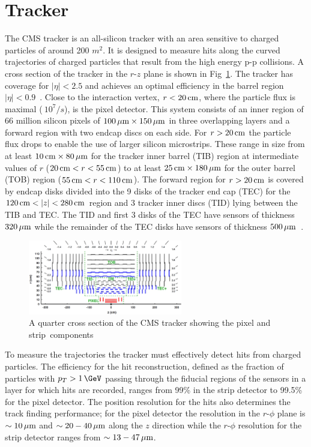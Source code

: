 \section{Tracker}
The CMS tracker is an all-silicon tracker with an area sensitive to charged particles of around 200 $m^2$. It is designed to measure hits along the
curved trajectories of charged particles that result from the high energy p-p collisions. A cross section of the tracker in the $r$-$z$ plane is shown in Fig~\ref{TRACKER_SLICE}.
The tracker has coverage for $|\eta| < 2.5$ and achieves an optimal efficiency in the barrel region $|\eta| < 0.9$~\cite{tracker_performance,tracker_tdr}. 
Close to the interaction vertex, $r < 20\,\text{cm}$, where the particle flux is maximal ($~10^7/s$), is the pixel detector. This system consists of an inner region of 66 million silicon 
pixels of $100\,\mu\text{m} \times 150\,\mu\text{m}$ in three overlapping layers and a forward region with two endcap discs on each side.
For $r > 20\,\text{cm}$ the particle flux drops to enable the use of larger silicon microstrips. These range in size from at least $10 \,\text{cm} \times 80 \,\mu\text{m}$ for the 
tracker inner barrel (TIB) region 
at intermediate values of $r$ ($20\,\text{cm} < r < 55\,\text{cm}$) to at least $25\,\text{cm} \times 180\,\mu\text{m}$ for the outer barrel (TOB) region ($55 \,\text{cm} < r < 110 \,\text{cm}$). The forward region
for $r > 20\,\text{cm}$ is covered by endcap disks divided into the 9 disks of the tracker end cap (TEC) for the $120 \,\text{cm} < |z| < 280 \,\text{cm}$ region and 
3 tracker inner discs (TID) lying between the TIB and TEC. The TID and first 3 disks of the TEC have sensors of thickness $320\,\mu\text{m}$ while the remainder of the TEC disks
have sensors of thickness $500\,\mu\text{m}$~\cite{tracker_tdr}.

\begin{figure}
\centering
    \includegraphics[width=0.6\textwidth]{./Figures/detector/CMS2Dtracker}
  \caption{A quarter cross section of the CMS tracker showing the pixel and strip~components~\cite{tracker_fig}}
  \label{TRACKER_SLICE}
\end{figure}

To measure the trajectories the tracker must effectively detect hits from charged particles. The efficiency for the 
hit reconstruction, defined as the fraction of particles with $p_T > 1\,\GeV$ passing through the fiducial regions of the sensors
in a layer for which hits are recorded, ranges from 99\% in the strip detector to 99.5\% for the pixel detector.
The position resolution for the hits also determines the track finding performance; for
the pixel detector the resolution in the $r$-$\phi$ plane is $\sim10\,\mu\text{m}$ and $\sim20-40\,\mu\text{m}$ along
the $z$ direction while the $r$-$\phi$ resolution for the strip detector ranges from $\sim13-47\,\mu\text{m}$.

